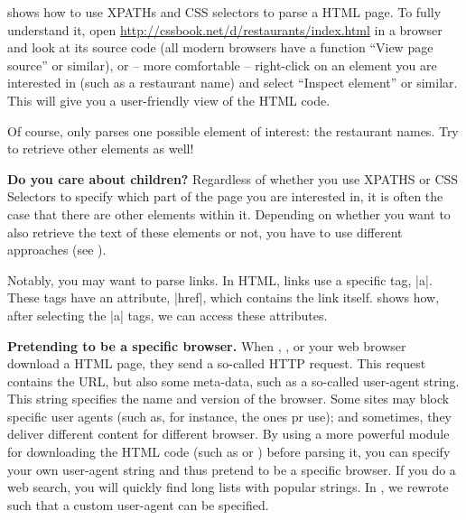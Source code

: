  shows how to use XPATHs and CSS selectors to parse
a HTML page. To fully understand it, open
\url{http://cssbook.net/d/restaurants/index.html} in a browser and
look at its source code (all modern browsers have a function ``View
page source'' or similar), or -- more comfortable -- right-click on an
element you are interested in (such as a restaurant name) and select
``Inspect element'' or similar. This will give you a user-friendly
view of the HTML code.



Of course,  only parses one possible element of interest: the restaurant names. Try to retrieve other elements as well!

\begin{feature}\textbf{Do you care about children?}
Regardless of whether you use XPATHS or CSS Selectors to specify which part of the page you are interested in, it is often the case that there are other elements within it. Depending on whether you want to also retrieve the text of these elements or not, you have to use different approaches (see ).
\end{feature}



Notably, you may want to parse links. In HTML, links use a specific tag, |a|. These tags have an attribute, |href|, which contains the link itself.  shows how, after selecting the |a| tags, we can access these attributes. 




\begin{feature}\textbf{Pretending to be a specific browser.}  When , , or your web browser download a HTML page, they send a so-called HTTP request. This request contains the URL, but also some meta-data, such as a so-called user-agent string. This string specifies the name and version of the browser. Some sites may block specific user agents (such as, for instance, the ones  pr  use); and sometimes, they deliver different content for different browser. By using a more powerful module for downloading the HTML code (such as  or ) before parsing it, you can specify your own user-agent string and thus pretend to be a specific browser. If you do a web search, you will quickly find long lists with popular strings. In , we rewrote  such that a custom user-agent can be specified. 
\end{feature}

